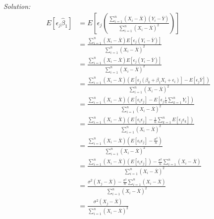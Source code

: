 \documentclass{article}
\newenvironment{solution}
    {\textit{Solution:}}
    {}
\begin{document}
\begin{solution}
\begin{align*}
E[\epsilon_j \hat \beta_1] &= E \left [ \epsilon_j  \left ( \frac{\sum_{i = 1}^n (X_i - \overline{X}) (Y_i - \overline{Y})}{\sum_{i = 1}^n (X_i - \overline X)^2} \right) \right] \\
&=   \frac{\sum_{i = 1}^n (X_i - \overline{X}) E[ \epsilon_j (Y_i - \overline{Y})]}{\sum_{i = 1}^n (X_i - \overline X)^2} \\
&=   \frac{\sum_{i = 1}^n (X_i - \overline{X}) E[ \epsilon_j (Y_i - \overline{Y})]}{\sum_{i = 1}^n (X_i - \overline X)^2} \\
&= \frac{\sum_{i = 1}^n (X_i - \overline{X}) \left ( E[ \epsilon_j (\beta_0 + \beta_1 X_i + \epsilon_i)] - E[ \epsilon_j \overline{Y}] \right)}{\sum_{i = 1}^n (X_i - \overline X)^2} \\
&= \frac{\sum_{i = 1}^n (X_i - \overline{X}) \left ( E[\epsilon_i \epsilon_j ] - E[ \epsilon_j \frac{1}{n} \sum_{k =  1}^n Y_i] \right)}{\sum_{i = 1}^n (X_i - \overline X)^2} \\
&= \frac{\sum_{i = 1}^n (X_i - \overline{X}) \left ( E[\epsilon_i \epsilon_j ] - \frac{1}{n} \sum_{k =  1}^n E[\epsilon_j \epsilon_k ] \right)}{\sum_{i = 1}^n (X_i - \overline X)^2} \\
&=  \frac{\sum_{i = 1}^n (X_i - \overline{X}) \left ( E[\epsilon_i \epsilon_j ] - \frac{\sigma^2}{n}  \right)}{\sum_{i = 1}^n (X_i - \overline X)^2} \\
&=  \frac{\sum_{i = 1}^n (X_i - \overline{X}) ( E[\epsilon_i \epsilon_j ] ) -  \frac{\sigma^2}{n}  \sum_{i = 1}^n (X_i - \overline{X})}{\sum_{i = 1}^n (X_i - \overline X)^2} \\
&=  \frac{\sigma^2 (X_j - \overline{X})-  \frac{\sigma^2}{n}  \sum_{i = 1}^n (X_i - \overline{X})}{\sum_{i = 1}^n (X_i - \overline X)^2} \\
&=    \frac{\sigma^2(X_j - \overline{X})}{\sum_{i = 1}^n (X_i - \overline X)^2} 
\end{align*}



\end{solution}
\end{document}

